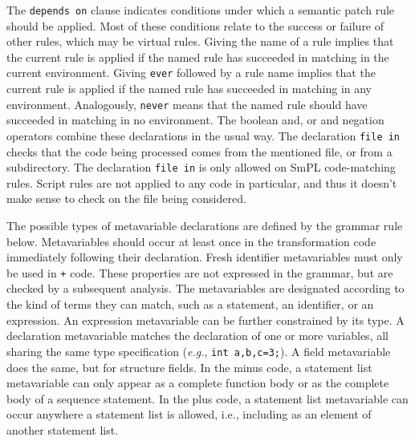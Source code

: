 The \texttt{depends on} clause indicates conditions under which a semantic
patch rule should be applied.  Most of these conditions relate to the
success or failure of other rules, which may be virtual rules.  Giving the
name of a rule implies that the current rule is applied if the named rule
has succeeded in matching in the current environment.  Giving \texttt{ever}
followed by a rule name implies that the current rule is applied if the
named rule has succeeded in matching in any environment.  Analogously,
\texttt{never} means that the named rule should have succeeded in matching
in no environment.  The boolean and, or and negation operators combine
these declarations in the usual way.  The declaration {\tt file in} checks
that the code being processed comes from the mentioned file, or from a
subdirectory.  The declaration {\tt file in} is only allowed on SmPL
code-matching rules.  Script rules are not applied to any code in
particular, and thus it doesn't make sense to check on the file being
considered.

The possible types of metavariable declarations are defined by the grammar
rule below.  Metavariables should occur at least once in the transformation
code immediately following their declaration.  Fresh identifier
metavariables must only be used in {\tt +} code.  These properties are not
expressed in the grammar, but are checked by a subsequent analysis.  The
metavariables are designated according to the kind of terms they can match,
such as a statement, an identifier, or an expression.  An expression
metavariable can be further constrained by its type.  A declaration
metavariable matches the declaration of one or more variables, all sharing
the same type specification ({\em e.g.}, {\tt int a,b,c=3;}).  A field
metavariable does the same, but for structure fields.  In the minus code, a
statement list metavariable can only appear as a complete function body or
as the complete body of a sequence statement.  In the plus code, a
statement list metavariable can occur anywhere a statement list is allowed,
i.e., including as an element of another statement list.

